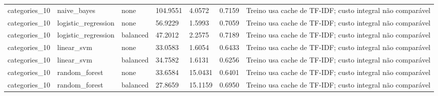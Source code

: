 \begin{tabular}{lllllll}
categories\_10 & naive\_bayes & none & 104.9551 & 4.0572 & 0.7159 & Treino usa cache de TF-IDF; custo integral não comparável \\
categories\_10 & logistic\_regression & none & 56.9229 & 1.5993 & 0.7059 & Treino usa cache de TF-IDF; custo integral não comparável \\
categories\_10 & logistic\_regression & balanced & 47.2012 & 2.2575 & 0.7189 & Treino usa cache de TF-IDF; custo integral não comparável \\
categories\_10 & linear\_svm & none & 33.0583 & 1.6054 & 0.6433 & Treino usa cache de TF-IDF; custo integral não comparável \\
categories\_10 & linear\_svm & balanced & 34.7582 & 1.6131 & 0.6256 & Treino usa cache de TF-IDF; custo integral não comparável \\
categories\_10 & random\_forest & none & 33.6584 & 15.0431 & 0.6401 & Treino usa cache de TF-IDF; custo integral não comparável \\
categories\_10 & random\_forest & balanced & 27.8659 & 15.1159 & 0.6950 & Treino usa cache de TF-IDF; custo integral não comparável \\
\hline
\end{tabular}
